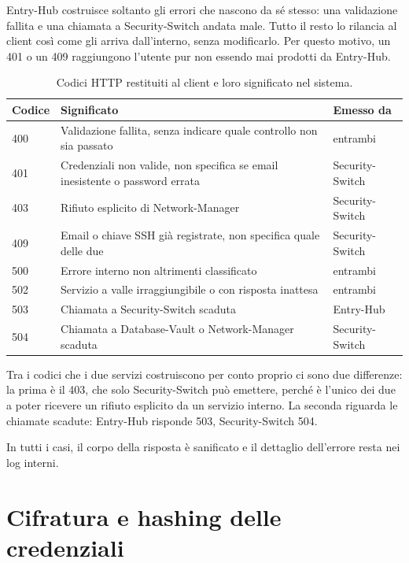 Entry-Hub costruisce soltanto gli errori che nascono da sé stesso: una validazione fallita e una
chiamata a Security-Switch andata male. Tutto il resto lo rilancia al client così come gli arriva
dall'interno, senza modificarlo. Per questo motivo, un 401 o un 409 raggiungono l'utente pur non
essendo mai prodotti da Entry-Hub.

\begin{table}[H]
\centering
\caption{Codici HTTP restituiti al client e loro significato nel sistema.}
\label{tab:codici-http}
\begin{tabular}{@{}l p{} l@{}}
\hline
\textbf{Codice} & \textbf{Significato} & \textbf{Emesso da} \\
\hline
400 & Validazione fallita, senza indicare quale controllo non sia passato & entrambi \\
401 & Credenziali non valide, non specifica se email inesistente o password errata & Security-Switch \\
403 & Rifiuto esplicito di Network-Manager & Security-Switch \\
409 & Email o chiave SSH già registrate, non specifica quale delle due & Security-Switch \\
500 & Errore interno non altrimenti classificato & entrambi \\
502 & Servizio a valle irraggiungibile o con risposta inattesa & entrambi \\
503 & Chiamata a Security-Switch scaduta & Entry-Hub \\
504 & Chiamata a Database-Vault o Network-Manager scaduta & Security-Switch \\
\hline
\end{tabular}
\end{table}

Tra i codici che i due servizi costruiscono per conto proprio ci sono due differenze: 
la prima è il 403, che solo Security-Switch può emettere, perché è l'unico dei due a poter ricevere un 
rifiuto esplicito da un servizio interno. La seconda riguarda le chiamate scadute: Entry-Hub risponde 503, 
Security-Switch 504.

In tutti i casi, il corpo della risposta è sanificato e il dettaglio dell'errore resta nei log
interni.

\section{Cifratura e hashing delle credenziali}

